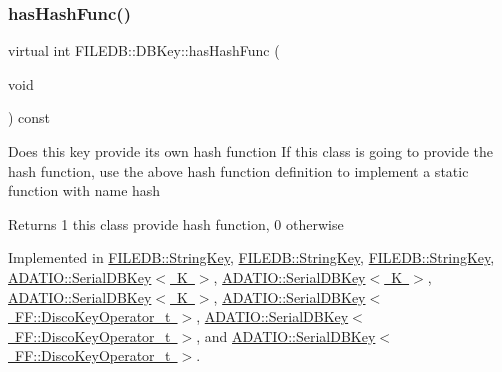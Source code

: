 \mbox{\label{classFILEDB_1_1DBKey_a541dab4f4083ae951dee2f30483eb18e}} 
\subsubsection{\texorpdfstring{hasHashFunc()}{hasHashFunc()}\hspace{0.1cm}{\footnotesize\ttfamily [2/3]}}
{\footnotesize\ttfamily virtual int F\+I\+L\+E\+D\+B\+::\+D\+B\+Key\+::has\+Hash\+Func (\begin{DoxyParamCaption}\item[{void}]{ }\end{DoxyParamCaption}) const\hspace{0.3cm}{\ttfamily [pure virtual]}}

Does this key provide its own hash function If this class is going to provide the hash function, use the above hash function definition to implement a static function with name hash

\begin{DoxyReturn}{Returns}
1 this class provide hash function, 0 otherwise 
\end{DoxyReturn}


Implemented in \mbox{\hyperlink{classFILEDB_1_1StringKey_afb2fa99d53c0f4b5aeca0377228ea722}{F\+I\+L\+E\+D\+B\+::\+String\+Key}}, \mbox{\hyperlink{classFILEDB_1_1StringKey_afb2fa99d53c0f4b5aeca0377228ea722}{F\+I\+L\+E\+D\+B\+::\+String\+Key}}, \mbox{\hyperlink{classFILEDB_1_1StringKey_afb2fa99d53c0f4b5aeca0377228ea722}{F\+I\+L\+E\+D\+B\+::\+String\+Key}}, \mbox{\hyperlink{classADATIO_1_1SerialDBKey_ae8926cd9bdef006f3729f4b724a2e2fe}{A\+D\+A\+T\+I\+O\+::\+Serial\+D\+B\+Key$<$ K $>$}}, \mbox{\hyperlink{classADATIO_1_1SerialDBKey_ae8926cd9bdef006f3729f4b724a2e2fe}{A\+D\+A\+T\+I\+O\+::\+Serial\+D\+B\+Key$<$ K $>$}}, \mbox{\hyperlink{classADATIO_1_1SerialDBKey_ae8926cd9bdef006f3729f4b724a2e2fe}{A\+D\+A\+T\+I\+O\+::\+Serial\+D\+B\+Key$<$ K $>$}}, \mbox{\hyperlink{classADATIO_1_1SerialDBKey_ae8926cd9bdef006f3729f4b724a2e2fe}{A\+D\+A\+T\+I\+O\+::\+Serial\+D\+B\+Key$<$ F\+F\+::\+Disco\+Key\+Operator\+\_\+t $>$}}, \mbox{\hyperlink{classADATIO_1_1SerialDBKey_ae8926cd9bdef006f3729f4b724a2e2fe}{A\+D\+A\+T\+I\+O\+::\+Serial\+D\+B\+Key$<$ F\+F\+::\+Disco\+Key\+Operator\+\_\+t $>$}}, and \mbox{\hyperlink{classADATIO_1_1SerialDBKey_ae8926cd9bdef006f3729f4b724a2e2fe}{A\+D\+A\+T\+I\+O\+::\+Serial\+D\+B\+Key$<$ F\+F\+::\+Disco\+Key\+Operator\+\_\+t $>$}}.

